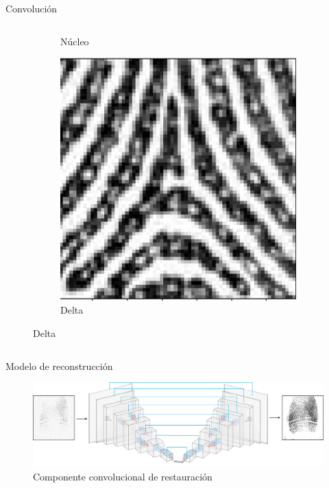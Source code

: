 \documentclass[12pt,aspectratio=169]{beamer}
\begin{document}
\begin{frame}{Convolución}
\begin{columns}[c]
\begin{itemize}
\begin{figure}
\begin{subfigure}{0.21\textwidth}
                        \caption{Núcleo}
                    \end{subfigure}
                    \begin{subfigure}{0.21\textwidth}
                        \centering
                        \includegraphics[scale=0.1]{figs/fhl_1.png}
                        \caption{Delta}
                    \end{subfigure}
                \end{figure}
                \vspace{3mm}
                
            \end{itemize}
    \end{columns}

\end{frame}

\begin{frame}{Modelo de reconstrucción}

   \begin{figure}
        \includegraphics[scale=0.4]{figs/layers_nn_two.png}
        \caption{Componente convolucional de restauración}
    \end{figure}

\end{frame}
\end{document}

